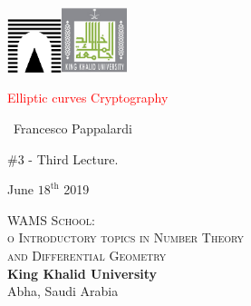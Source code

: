 \documentclass[handout]{beamer}%
\title[Elliptic curves over $\F_{q}$]{\insertlecture}
\theoremstyle{definition}
\begin{document}
\begin{frame}
\includegraphics[width=1.6cm]{images/roma3.pdf}\hfill\includegraphics[width=1.9cm]{images/kku.jpeg}
\vfill

\begin{center}\begin{sc}
\begin{Large}

\textcolor{red}{Elliptic curves Cryptography}
\end{Large}\bigskip

\ {Francesco Pappalardi}\bigskip\bigskip

\begin{large}\begin{bf}\#3 - Third Lecture.
\end{bf}\end{large}\medskip

June $18^{\text{th}}$ 2019\medskip
\vfill
\end{sc}\end{center}

\begin{minipage}[b]{9.3cm}
\textsc{WAMS School:\\o
Introductory topics in Number Theory\\ and Differential Geometry}\\
\textbf{King Khalid University}\\
Abha, Saudi Arabia
\end{minipage}\hfill
\end{frame}
\end{document}
